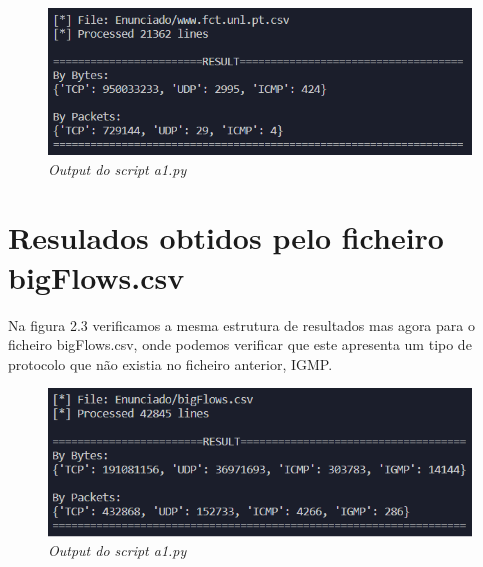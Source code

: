 \begin{figure}[h]
    \label{high}
    \centering
    \includegraphics[width=1\textwidth]{Images/a1/a1_a.png}
    \caption{\textit{Output do script a1.py}}
\end{figure}


\section{Resulados obtidos pelo ficheiro bigFlows.csv}

Na figura 2.3 verificamos a mesma estrutura de resultados mas agora para o ficheiro bigFlows.csv, onde podemos verificar que este apresenta um tipo de protocolo que não existia no ficheiro anterior, IGMP.

\begin{figure}[h]
    \label{high}
    \centering
    \includegraphics[width=1\textwidth]{Images/a1/a1_b.png}
    \caption{\textit{Output do script a1.py}}
\end{figure}